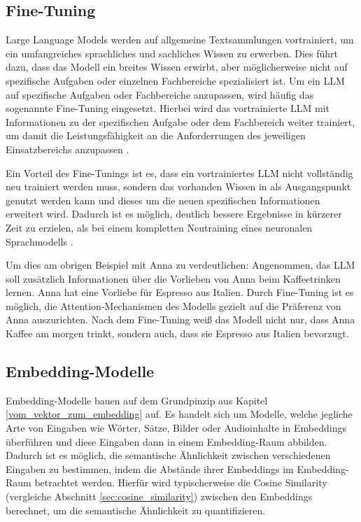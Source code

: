 \subsection{Fine-Tuning}
\label{sec:fine_tuning}
Large Language Models werden auf allgemeine Textsammlungen vortrainiert, um ein umfangreiches sprachliches und sachliches Wissen zu erwerben.
Dies führt dazu, dass das Modell ein breites Wissen erwirbt, aber möglicherweise nicht auf spezifische Aufgaben oder einzelnen Fachbereiche spezialisiert ist.
Um ein LLM auf spezifische Aufgaben oder Fachbereiche anzupassen, wird häufig das sogenannte Fine-Tuning eingesetzt. 
Hierbei wird das vortrainierte LLM mit Informationen zu der spezifischen Aufgabe oder dem Fachbereich weiter trainiert, 
um damit die Leistungsfähigkeit an die Anforderrungen des jeweiligen Einsatzbereichs anzupassen \parencite{Wei2022,Zhang2023InstructionTuning}.

Ein Vorteil des Fine-Tunings ist es, dass ein vortrainiertes LLM nicht vollständig neu trainiert werden muss, 
sondern das vorhanden Wissen in als Ausgangspunkt genutzt werden kann und dieses um die neuen spezifischen Informationen erweitert wird.
Dadurch ist es möglich, deutlich bessere Ergebnisse in kürzerer Zeit zu erzielen, als bei einem kompletten Neutraining eines neuronalen Sprachmodells \parencite{Wei2022}.

Um dies am obrigen Beispiel mit Anna zu verdeutlichen: Angenommen, das LLM soll zusätzlich Informationen über die Vorlieben von Anna beim Kaffeetrinken lernen. 
Anna hat eine Vorliebe für Espresso aus Italien.
Durch Fine-Tuning ist es möglich, die Attention-Mechanismen des Modells gezielt auf die Präferenz von Anna auszurichten.
Nach dem Fine-Tuning weiß das Modell nicht nur, dass Anna Kaffee am morgen trinkt, sondern auch, dass sie Espresso aus Italien bevorzugt.

\subsection{Embedding-Modelle}
\label{sec:embedding_modelle}

Embedding-Modelle bauen auf dem Grundpinzip aus Kapitel \ref{vom_vektor_zum_embedding} auf. 
Es handelt sich um Modelle, welche jegliche Arte von Eingaben wie Wörter, Sätze, Bilder oder Audioinhalte in Embeddings überführen und diese Eingaben dann in einem Embedding-Raum abbilden.
Dadurch ist es möglich, die semantische Ähnlichkeit zwischen verschiedenen Eingaben zu bestimmen, indem die Abstände ihrer Embeddings im Embedding-Raum betrachtet werden. 
Hierfür wird typischerweise die Cosine Similarity (vergleiche Abschnitt \ref{sec:cosine_similarity}) zwischen den Embeddings berechnet, um die semantische Ähnlichkeit zu quantifizieren.

